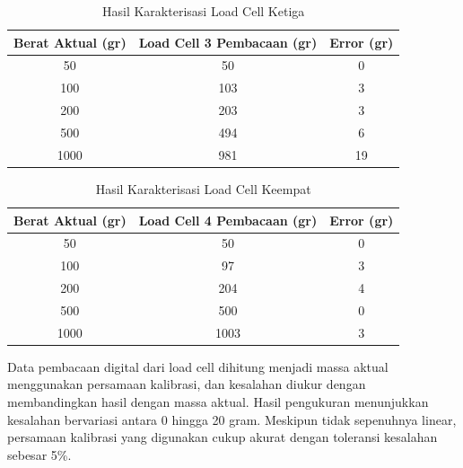 \begin{enumerate}[label=\Alph*.]
        \begin{table}[h]
            \centering
            \caption{Hasil Karakterisasi Load Cell Ketiga}
            \begin{tabular}{|c|c|c|}
                \hline
                \textbf{Berat Aktual (gr)} & \textbf{Load Cell 3 Pembacaan (gr)} & \textbf{Error (gr)} \\
                \hline
                50        & 50        & 0    \\    
                100       & 103       & 3    \\    
                200       & 203       & 3    \\    
                500       & 494       & 6    \\    
                1000      & 981       & 19   \\               
                \hline
        \end{tabular}
        \label{tab:Kalibrasi_Load_Cell_3}
        \end{table}

        \begin{table}[h]
            \centering
            \caption{Hasil Karakterisasi Load Cell Keempat}
            \begin{tabular}{|c|c|c|}
                \hline
                \textbf{Berat Aktual (gr)} & \textbf{Load Cell 4 Pembacaan (gr)} & \textbf{Error (gr)} \\
                \hline
                50        & 50        & 0   \\     
                100       & 97        & 3   \\     
                200       & 204       & 4   \\     
                500       & 500       & 0   \\     
                1000      & 1003      & 3   \\                
                \hline
        \end{tabular}
        \label{tab:Kalibrasi_Load_Cell_4}
        \end{table}
    
        
        \hspace*{1em} Data pembacaan digital dari load cell dihitung menjadi massa aktual menggunakan persamaan kalibrasi, dan kesalahan diukur dengan membandingkan hasil dengan massa aktual. Hasil pengukuran menunjukkan kesalahan bervariasi antara 0 hingga 20 gram. Meskipun tidak sepenuhnya linear, persamaan kalibrasi yang digunakan cukup akurat dengan toleransi kesalahan sebesar 5\%.


\end{enumerate}
